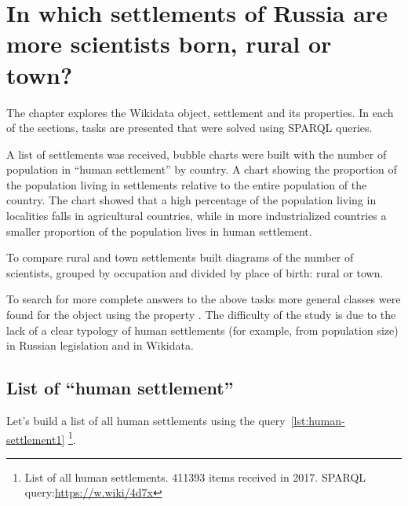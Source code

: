 \setchapterpreamble[u]{\margintoc}
\chapter[In which settlements of Russia are more scientists born, rural or town?]{In which settlements of Russia are more scientists born, rural or town?\protect\footnotemark}


The chapter explores the Wikidata object,  settlement and its properties. In each of the sections, 
tasks are presented that were solved using SPARQL queries.

A list of settlements was received,
bubble charts were built with the number of population in ``human settlement'' by country.
A chart showing the proportion of the population
living in settlements relative to the entire population of the country.
The chart showed that a high percentage of the population living in localities
falls in agricultural countries, while in more industrialized countries
a smaller proportion of the population lives in human settlement.

To compare rural and town settlements
built diagrams of the number of scientists, grouped by occupation
and divided by place of birth: rural or town.

To search for more complete answers to the above tasks
more general classes were found for the object 
using the property .
The difficulty of the study is due to the lack of a clear typology of human settlements
(for example, from population size) in Russian legislation and in Wikidata.

\section{List of ``human settlement''}

Let's build a list of all human settlements using the query~\ref{lst:human-settlement1} \footnote{List of all human settlements. \num{411393} items received in 2017. SPARQL query:\href{https://w.wiki/4d7x}{https://w.wiki/4d7x}}.

